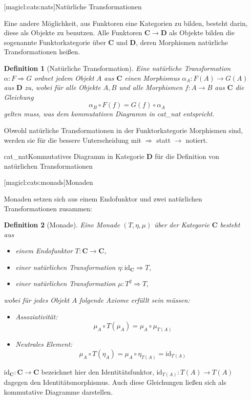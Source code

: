 \documentclass[a4paper, bibgerm]{book}
\newcommand\lsubsection{}
\newcommand\abb{}
\newcommand\fig{}
\newcommand\ato{\rightarrow} %
\newcommand\nto{\Rightarrow} %
\newtheorem{defini}{Definition}
\newcommand{\defi}[2]{%
  \begin{defini}[#1]
    \label{def:#1}
    #2
  \end{defini}
}
\begin{document}
\lsubsection[magicl:cats:nats]{Natürliche Transformationen}

Eine andere Möglichkeit, aus Funktoren eine Kategorien zu bilden,
besteht darin, diese als Objekte zu benutzen. Alle Funktoren $\mathbf{C}
\ato \mathbf{D}$ als Objekte bilden die sogenannte Funktorkategorie über
$\mathbf{C}$ und $\mathbf{D}$, deren Morphismen natürliche
Transformationen heißen.

\defi{Natürliche Transformation}{Eine natürliche Transformation $\alpha:F \nto
G$ ordnet jedem Objekt $A$ aus $\mathbf{C}$ einen Morphismus
$\alpha_A:F(A) \ato G(A)$ aus $\mathbf{D}$ zu, wobei für alle Objekte
$A,B$ und alle Morphismen $f:A \ato B$ aus $\mathbf{C}$ die
Gleichung
$$\alpha_B \circ F(f) = G(f) \circ \alpha_A $$
gelten muss, was dem kommutativen Diagramm in \abb{cat_nat}
entspricht.
}

Obwohl natürliche Transformationen in der Funktorkategorie Morphismen
sind, werden sie für die bessere Unterscheidung mit $\nto$ statt
$\ato$ notiert.

\fig{cat_nat}{Kommutatives Diagramm in Kategorie $\mathbf{D}$ für die Definition von
  natürlichen Transformationen}

\lsubsection[magicl:cats:monads]{Monaden}

Monaden setzen sich aus einem Endofunktor und zwei natürlichen
Transformationen zusammen:
\defi{Monade}{Eine Monade $(T,\eta,\mu)$ über der Kategorie $\mathbf{C}$ besteht aus
  \begin{itemize}
  \item einem Endofunktor $T:\mathbf{C} \ato \mathbf{C}$,
  \item einer natürlichen Transformation $\eta:\mathrm{id}_{\mathbf{C}} \nto T$,
  \item einer natürlichen Transformation $\mu:T^2 \nto T$,
  \end{itemize}
wobei für jedes Objekt $A$ folgende Axiome erfüllt sein müssen:
\begin{itemize}
\item Assoziativität: $$\mu_A \circ T(\mu_A) = \mu_A \circ \mu_{T(A)}$$
\item Neutrales Element: $$\mu_A \circ T(\eta_A) = \mu_A \circ \eta_{T(A)} = \mathrm{id}_{T(A)}$$
\end{itemize}
}
$\mathrm{id}_\mathbf{C}:\mathbf{C} \ato \mathbf{C}$ bezeichnet hier den Identitätsfunktor,
$\mathrm{id}_{T(A)}:T(A) \ato T(A)$ dagegen den Identitätsmorphismus. Auch diese Gleichungen ließen sich
als kommutative Diagramme darstellen.
\end{document}
